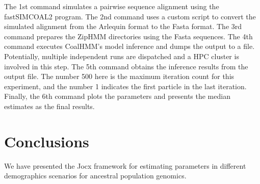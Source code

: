 \documentclass[graybox]{svmult}
\begin{document}
The 1st command simulates a pairwise sequence alignment using the fastSIMCOAL2 program.  The 2nd command uses a custom script to convert the simulated alignment from the Arlequin format to the Fasta format.  The 3rd command prepares the ZipHMM directories using the Fasta sequences.  The 4th command executes CoalHMM's model inference and dumps the output to a file.  Potentially, multiple independent runs are dispatched and a HPC cluster is involved in this step.  The 5th command obtains the inference results from the output file.  The number 500 here is the maximum iteration count for this experiment, and the number 1 indicates the first particle in the last iteration.  Finally, the 6th command plots the parameters and presents the median estimates as the final results.

\section{Conclusions}

We have presented the Jocx framework for estimating parameters in different demographics scenarios for ancestral population genomics. 





\end{document}
